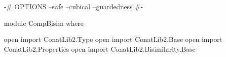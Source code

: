 \begin{code}[hide]
{-# OPTIONS --safe --cubical --guardedness #-}

module CompBisim where

open import ConatLib2.Type
open import ConatLib2.Base
open import ConatLib2.Properties
open import ConatLib2.Bisimilarity.Base
\end{code}



